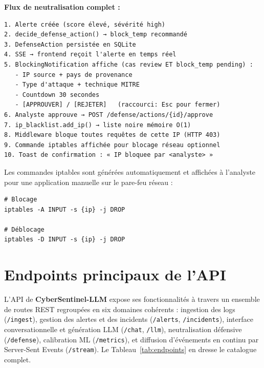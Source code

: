 \documentclass[12pt,a4paper]{report}
\begin{document}
\begin{onehalfspace}
\textbf{Flux de neutralisation complet :}
\end{onehalfspace}

\begin{tcolorbox}[colback=lightblue, colframe=darkblue, arc=5pt,
  title={\textbf{Flux : Détection $\rightarrow$ Notification $\rightarrow$ Blocage}}]
\begin{small}
\begin{verbatim}
1. Alerte créée (score élevé, sévérité high)
2. decide_defense_action() → block_temp recommandé
3. DefenseAction persistée en SQLite
4. SSE → frontend reçoit l'alerte en temps réel
5. BlockingNotification affiche (cas review ET block_temp pending) :
   - IP source + pays de provenance
   - Type d'attaque + technique MITRE
   - Countdown 30 secondes
   - [APPROUVER] / [REJETER]   (raccourci: Esc pour fermer)
6. Analyste approuve → POST /defense/actions/{id}/approve
7. ip_blacklist.add_ip() → liste noire mémoire O(1)
8. Middleware bloque toutes requêtes de cette IP (HTTP 403)
9. Commande iptables affichée pour blocage réseau optionnel
10. Toast de confirmation : « IP bloquee par <analyste> »
\end{verbatim}
\end{small}
\end{tcolorbox}

\begin{onehalfspace}
Les commandes iptables sont générées automatiquement et affichées à
l'analyste pour une application manuelle sur le pare-feu réseau :
\end{onehalfspace}

\begin{tcolorbox}[colback=lightblue, colframe=darkblue, arc=5pt,
  title={\textbf{Commandes iptables générées}}]
\begin{small}
\begin{verbatim}
# Blocage
iptables -A INPUT -s {ip} -j DROP

# Déblocage
iptables -D INPUT -s {ip} -j DROP
\end{verbatim}
\end{small}
\end{tcolorbox}

\section{Endpoints principaux de l'API}
\begin{onehalfspace}
L'API de \textbf{CyberSentinel-LLM} expose ses fonctionnalités à travers
un ensemble de routes REST regroupées en six domaines cohérents : ingestion
des logs (\texttt{/ingest}), gestion des alertes et des incidents
(\texttt{/alerts}, \texttt{/incidents}), interface conversationnelle et
génération LLM (\texttt{/chat}, \texttt{/llm}), neutralisation défensive
(\texttt{/defense}), calibration ML (\texttt{/metrics}), et diffusion
d'événements en continu par Server-Sent Events (\texttt{/stream}).
Le Tableau~\ref{tab:endpoints} en dresse le catalogue complet.
\end{onehalfspace}
\end{document}

